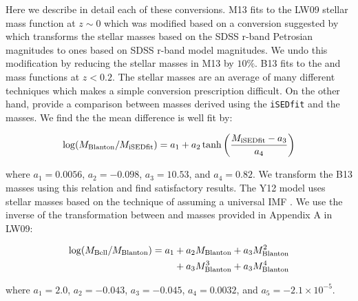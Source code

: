 \documentclass[a4paper,fleqn,usenatbib]{mnras}
\begin{document}
Here we describe in detail each of these conversions.  M13 fits to the LW09 stellar mass function at $z \sim 0$ which was modified based on a conversion suggested by \citep{Guo:2010do} which transforms the stellar masses based on the SDSS r-band Petrosian magnitudes to ones based on SDSS r-band model magnitudes.  We undo this modification by reducing the stellar masses in M13 by $10\%$.  B13 fits to the \citet{Baldry:2008hm} and \citet{Moustakas:2013il} mass functions at $z < 0.2$.  The \citet{Baldry:2008hm} stellar masses are an average of many different techniques which makes a simple conversion prescription difficult.  On the other hand, \citet{Moustakas:2013il} provide a comparison between masses derived using the {\tt iSEDfit} and the \citet{Blanton:2007cv} masses.  We find the the mean difference is well fit by:
%
\begin{linenomath}
\begin{equation}
\log(M_{\rm Blanton}/M_{\rm iSEDfit}) = a_1+a_2\tanh\left(\frac{M_{\rm iSEDfit} - a_3}{a_4}\right)
\end{equation}
\end{linenomath}
%
where $a_1 = 0.0056$, $a_2 = -0.098$, $a_3 =10.53$, and $a_4 = 0.82$.  We transform the B13 masses using this relation and find satisfactory results.  The Y12 model uses stellar masses based on the technique of \citet{Bell:2003hs} assuming a universal IMF \citep{Kroupa:2001ki, Borch:2006eu}.  We use the inverse of the transformation between \citet{Bell:2003hs} and \citet{Blanton:2007cv} masses provided in Appendix A in LW09:
%
\begin{linenomath}
\begin{align}
\log(M_{\rm Bell}/M_{\rm Blanton}) = a_1 &+ a_2 M_{\rm Blanton} + a_3 M_{\rm Blanton}^2 \nonumber \\
  & + a_3 M_{\rm Blanton}^3 + a_3 M_{\rm Blanton}^4
\end{align}
\end{linenomath}
%
where $a_1 = 2.0$, $a_2 = -0.043$, $a_3 = -0.045$, $a_4 = 0.0032$, and $a_5=-2.1\times10^{-5}$.
\end{document}
